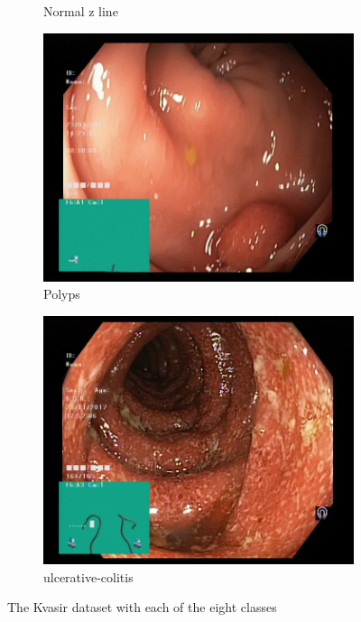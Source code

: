 \begin{figure}
\begin{subfigure}[b]{0.4\textwidth}
            \caption{{\small Normal z line}}    
            \label{fig:kvasir-normal-z-line}
        \end{subfigure}
        \qquad\vfill%
        \begin{subfigure}[b]{0.4\textwidth}   
            \centering 
            \includegraphics[width=\textwidth]{experiments/images/polyps.jpg}
            \caption{{\small Polyps}}    
            \label{fig:kvasir-polyps}
        \end{subfigure}
        \qquad%
        \begin{subfigure}[b]{0.4\textwidth}   
            \centering 
            \includegraphics[width=\textwidth]{experiments/images/ulcerative-colitis.jpg}
            \caption{{\small ulcerative-colitis}}    
            \label{fig:kvasir-ulcerative-colitis}
        \end{subfigure}
        \caption{\small The Kvasir dataset with each of the eight classes} 
        \label{fig:Kvasir}
    \end{figure}
    
